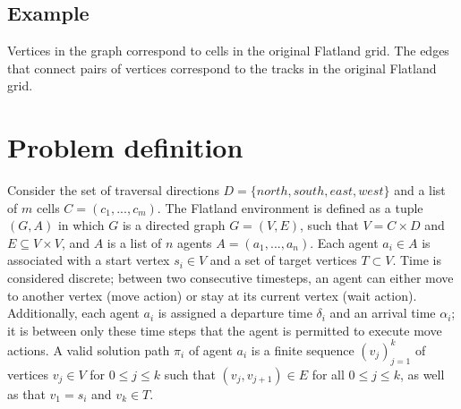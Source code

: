 \subsection{Example}\label{sec:example}
Vertices in the graph correspond to cells in the original Flatland grid.  
The edges that connect pairs of vertices correspond to the tracks in the original Flatland grid.  

\pagebreak

\section{Problem definition}\label{sec:problem_definition}
Consider the set of traversal directions $D = \{north, south, east, west\}$  and a list of $m$ cells $C = (c_1, ..., c_m)$. 
The Flatland environment is defined as a tuple $(G,A)$ in which $G$ is a directed graph $G = (V,E)$, such that $V = C \times D$ and $E \subseteq V \times V$, and $A$ is a list of $n$ agents $A = (a_1, ..., a_n)$.
Each agent $a_i \in A$ is associated with a start vertex $s_i \in V$ and a set of target vertices $T \subset V$.
Time is considered discrete; between two consecutive timesteps, an agent can either move to another vertex (move action) or stay at its current vertex (wait action).  
Additionally, each agent $a_i$ is assigned a departure time $\delta_i$ and an arrival time $\alpha_i$; it is between only these time steps that the agent is permitted to execute move actions.
A valid solution path $\pi_i$ of agent $a_i$ is a finite sequence $(v_j)_{j=1}^k$ of vertices $v_j \in V$ for $0 \leq j \leq k$ such that $(v_j,v_{j+1}) \in E$ for all $0 \leq j \leq k$, as well as that $v_1 = s_i$ and $v_k \in T$.
